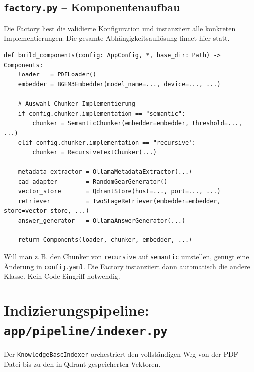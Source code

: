 \documentclass[12pt, a4paper]{article}
\begin{document}
\subsection{\texttt{factory.py} -- Komponentenaufbau}

Die Factory liest die validierte Konfiguration und instanziiert alle konkreten
Implementierungen. Die gesamte Abhängigkeitsauflösung findet hier statt.

\begin{lstlisting}[style=pythonstyle, caption={Factory-Funktion (factory.py)}]
def build_components(config: AppConfig, *, base_dir: Path) -> Components:
    loader   = PDFLoader()
    embedder = BGEM3Embedder(model_name=..., device=..., ...)

    # Auswahl Chunker-Implementierung
    if config.chunker.implementation == "semantic":
        chunker = SemanticChunker(embedder=embedder, threshold=..., ...)
    elif config.chunker.implementation == "recursive":
        chunker = RecursiveTextChunker(...)

    metadata_extractor = OllamaMetadataExtractor(...)
    cad_adapter        = RandomGearGenerator()
    vector_store       = QdrantStore(host=..., port=..., ...)
    retriever          = TwoStageRetriever(embedder=embedder, store=vector_store, ...)
    answer_generator   = OllamaAnswerGenerator(...)

    return Components(loader, chunker, embedder, ...)
\end{lstlisting}

\begin{infobox}
Will man z.\,B. den Chunker von \texttt{recursive} auf \texttt{semantic} umstellen,
genügt eine Änderung in \texttt{config.yaml}. Die Factory instanziiert dann automatisch
die andere Klasse. Kein Code-Eingriff notwendig.
\end{infobox}

\newpage
\section{Indizierungspipeline: \texttt{app/pipeline/indexer.py}}

Der \texttt{KnowledgeBaseIndexer} orchestriert den vollständigen Weg von der PDF-Datei
bis zu den in Qdrant gespeicherten Vektoren.
\end{document}
